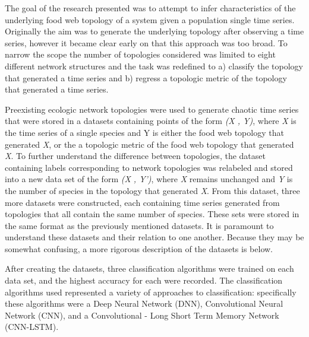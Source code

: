 \documentclass[letterpaper, 10 pt, conference]{ieeeconf}  %
\begin{document}
    The goal of the research presented was to attempt to infer characteristics of the underlying food web topology of a system given a population single time series. Originally the aim was to generate the underlying topology after observing a time series, however it became clear early on that this approach was too broad. To narrow the scope the number of topologies considered was limited to eight different network structures and the task was redefined to a) classify the topology that generated a time series and b) regress a topologic metric of the topology that generated a time series. 
    
    Preexisting ecologic network topologies were used to generate chaotic time series that were stored in a datasets containing points of the form \textit{(X , Y)}, where \textit{X} is the time series of a single species and Y is either the food web topology that generated \textit{X}, or the a topologic metric of the food web topology that generated \textit{X}. To further understand the difference between topologies, the dataset containing labels corresponding to network topologies was relabeled and stored into a new data set of the form \textit{(X , Y’)}, where \textit{X} remains unchanged and \textit{Y} is the number of species in the topology that generated \textit{X}. From this dataset, three more datasets were constructed, each containing time series generated from topologies that all contain the same number of species. These sets were stored in the same format as the previously mentioned datasets. It is paramount to understand these datasets and their relation to one another. Because they may be somewhat confusing, a more rigorous description of the datasets is below.

    
    After creating the datasets, three classification algorithms were trained on each data set, and the highest accuracy for each were recorded. The classification algorithms used represented a variety of approaches to classification: specifically these algorithms were a Deep Neural Network (DNN), Convolutional Neural Network (CNN), and a Convolutional - Long Short Term Memory Network (CNN-LSTM). 
    
\end{document}
